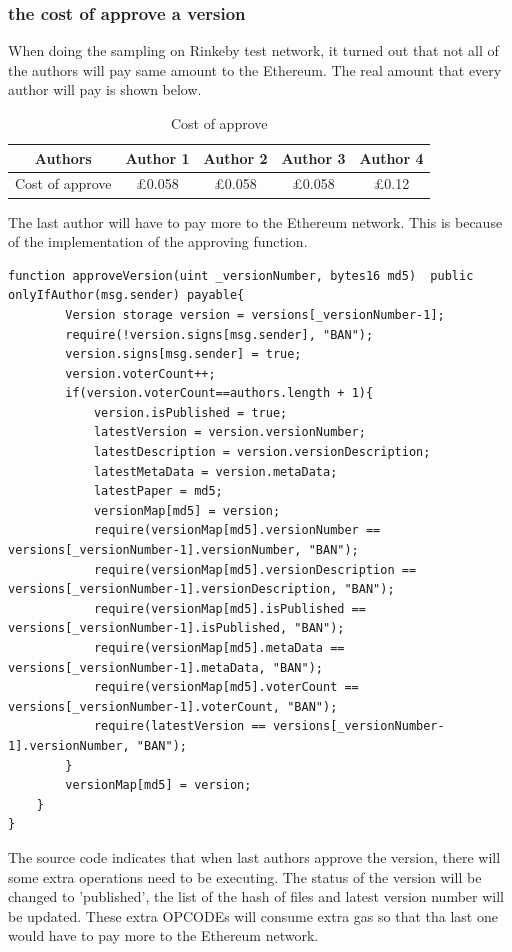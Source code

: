 \documentclass[openany,12pt]{ecsthesis}      %
\begin{document}
\subsubsection{the cost of approve a version}
When doing the sampling on Rinkeby test network, 
it turned out that not all of the authors will pay same amount to the Ethereum.
The real amount that every author will pay is shown below.
\begin{table}[H] 
  \centering
  \caption{Cost of approve}
\begin{tabular}{|c|c|c|c|c|}
  \hline  Authors & Author 1 & Author 2 & Author 3& Author 4\\
  \hline Cost of approve & £0.058 & £0.058 & £0.058 & £0.12 \\
  \hline
 \end{tabular}
\end{table}
The last author will have to pay more to the Ethereum network. 
This is because of the implementation of the approving function.
\begin{lstlisting}[language=Solidity]
  function approveVersion(uint _versionNumber, bytes16 md5)  public onlyIfAuthor(msg.sender) payable{
        Version storage version = versions[_versionNumber-1];
        require(!version.signs[msg.sender], "BAN");
        version.signs[msg.sender] = true;
        version.voterCount++;
        if(version.voterCount==authors.length + 1){
            version.isPublished = true;
            latestVersion = version.versionNumber;
            latestDescription = version.versionDescription;
            latestMetaData = version.metaData;
            latestPaper = md5;
            versionMap[md5] = version;
            require(versionMap[md5].versionNumber == versions[_versionNumber-1].versionNumber, "BAN");
            require(versionMap[md5].versionDescription == versions[_versionNumber-1].versionDescription, "BAN");
            require(versionMap[md5].isPublished == versions[_versionNumber-1].isPublished, "BAN");
            require(versionMap[md5].metaData == versions[_versionNumber-1].metaData, "BAN");
            require(versionMap[md5].voterCount == versions[_versionNumber-1].voterCount, "BAN");
            require(latestVersion == versions[_versionNumber-1].versionNumber, "BAN");
        }
        versionMap[md5] = version;
    }
}
\end{lstlisting}
The source code indicates that when last authors approve the version, 
there will some extra operations need to be executing. 
The status of the version will be changed to 'published', 
the list of the hash of files and latest version number will be updated.
These extra OPCODEs will consume extra gas so that tha last one would have to pay more to the Ethereum network.
\end{document}
